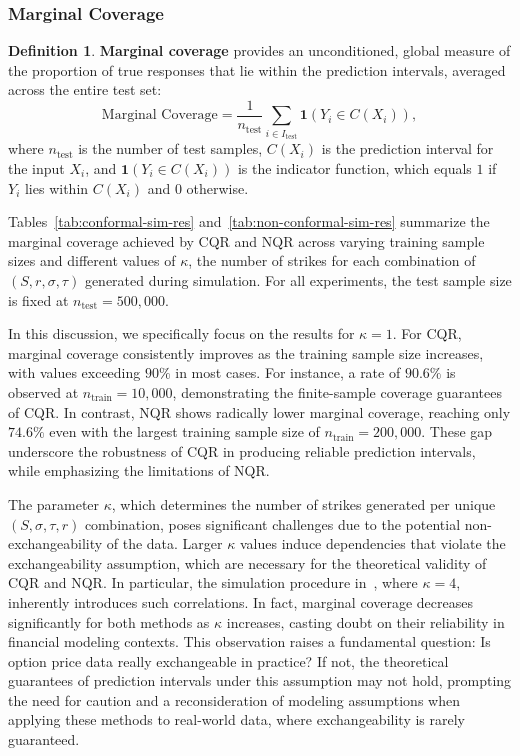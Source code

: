 \documentclass{article}
\theoremstyle{definition}
\newtheorem{definition}{Definition}
\begin{document}
\subsubsection{Marginal Coverage} %

\begin{definition}
\textbf{Marginal coverage} provides an unconditioned, global measure of the proportion of true responses that lie within the prediction intervals, averaged across the entire test set:
\begin{equation}
\text{Marginal Coverage} = \frac{1}{n_{\text{test}}} \sum_{i \in I_{\text{test}}} \mathbf{1}(Y_i \in C(X_i)),
\end{equation}
where $n_{\text{test}}$ is the number of test samples, $C(X_i)$ is the prediction interval for the input $X_i$, and $\mathbf{1}(Y_i \in C(X_i))$ is the indicator function, which equals $1$ if $Y_i$ lies within $C(X_i)$ and $0$ otherwise.
\end{definition}

Tables~\ref{tab:conformal-sim-res} and~\ref{tab:non-conformal-sim-res} summarize the marginal coverage achieved by CQR and NQR across varying training sample sizes and different values of $\kappa$, the number of strikes for each combination of $(S, r, \sigma, \tau)$ generated during simulation. For all experiments, the test sample size is fixed at $n_{\text{test}} = 500,000$.

In this discussion, we specifically focus on the results for $\kappa = 1$. For CQR, marginal coverage consistently improves as the training sample size increases, with values exceeding $90\%$ in most cases. For instance, a rate of $90.6\%$ is observed at $n_{\text{train}} = 10,000$, demonstrating the finite-sample coverage guarantees of CQR. In contrast, NQR shows radically lower marginal coverage, reaching only $74.6\%$ even with the largest training sample size of $n_{\text{train}} = 200,000$. These gap underscore the robustness of CQR in producing reliable prediction intervals, while emphasizing the limitations of NQR.

The parameter $\kappa$, which determines the number of strikes generated per unique $(S, \sigma, \tau, r)$ combination, poses significant challenges due to the potential non-exchangeability of the data. Larger $\kappa$ values induce dependencies that violate the exchangeability assumption, which are necessary for the theoretical validity of CQR and NQR. In particular, the simulation procedure in~\cite{bastos}, where $\kappa = 4$, inherently introduces such correlations. In fact, marginal coverage decreases significantly for both methods as $\kappa$ increases, casting doubt on their reliability in financial modeling contexts. This observation raises a fundamental question: Is option price data really exchangeable in practice? If not, the theoretical guarantees of prediction intervals under this assumption may not hold, prompting the need for caution and a reconsideration of modeling assumptions when applying these methods to real-world data, where exchangeability is rarely guaranteed.
\end{document}
